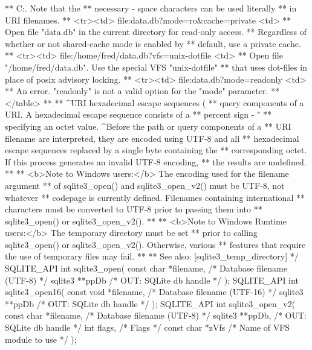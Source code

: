 \begin{Codex}[label=sqlite3.h,numbers=left]
{**          C:. Note that the %
**          necessary - space characters can be used literally
**          in URI filenames.
** <tr><td> file:data.db?mode=ro&cache=private <td> 
**          Open file "data.db" in the current directory for read-only access.
**          Regardless of whether or not shared-cache mode is enabled by
**          default, use a private cache.
** <tr><td> file:/home/fred/data.db?vfs=unix-dotfile <td>
**          Open file "/home/fred/data.db". Use the special VFS "unix-dotfile"
**          that uses dot-files in place of posix advisory locking.
** <tr><td> file:data.db?mode=readonly <td> 
**          An error. "readonly" is not a valid option for the "mode" parameter.
** </table>
**
** ^URI hexadecimal escape sequences (%
** query components of a URI. A hexadecimal escape sequence consists of a
** percent sign - "%
** specifying an octet value. ^Before the path or query components of a
** URI filename are interpreted, they are encoded using UTF-8 and all 
** hexadecimal escape sequences replaced by a single byte containing the
** corresponding octet. If this process generates an invalid UTF-8 encoding,
** the results are undefined.
**
** <b>Note to Windows users:</b>  The encoding used for the filename argument
** of sqlite3_open() and sqlite3_open_v2() must be UTF-8, not whatever
** codepage is currently defined.  Filenames containing international
** characters must be converted to UTF-8 prior to passing them into
** sqlite3_open() or sqlite3_open_v2().
**
** <b>Note to Windows Runtime users:</b>  The temporary directory must be set
** prior to calling sqlite3_open() or sqlite3_open_v2().  Otherwise, various
** features that require the use of temporary files may fail.
**
** See also: [sqlite3_temp_directory]
*/
SQLITE_API int sqlite3_open(
  const char *filename,   /* Database filename (UTF-8) */
  sqlite3 **ppDb          /* OUT: SQLite db handle */
);
SQLITE_API int sqlite3_open16(
  const void *filename,   /* Database filename (UTF-16) */
  sqlite3 **ppDb          /* OUT: SQLite db handle */
);
SQLITE_API int sqlite3_open_v2(
  const char *filename,   /* Database filename (UTF-8) */
  sqlite3 **ppDb,         /* OUT: SQLite db handle */
  int flags,              /* Flags */
  const char *zVfs        /* Name of VFS module to use */
);

}
\end{Codex}
